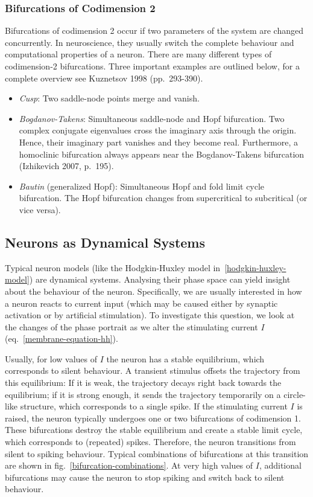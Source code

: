 \documentclass[12pt,a4paper,]{report}
\begin{document}
\subsubsection{Bifurcations of Codimension
2}\label{bifurcations-of-codimension-2}

Bifurcations of codimension 2 occur if two parameters of the system are
changed concurrently. In neuroscience, they usually switch the complete
behaviour and computational properties of a neuron. There are many
different types of codimension-2 bifurcations. Three important examples
are outlined below, for a complete overview see Kuznetsov 1998
(pp.~293-390).

\begin{itemize}
\item
  \emph{Cusp}: Two saddle-node points merge and vanish.
\item
  \emph{Bogdanov-Takens}: Simultaneous saddle-node and Hopf bifurcation.
  Two complex conjugate eigenvalues cross the imaginary axis through the
  origin. Hence, their imaginary part vanishes and they become real.
  Furthermore, a homoclinic bifurcation always appears near the
  Bogdanov-Takens bifurcation (Izhikevich 2007, p.~195).
\item
  \emph{Bautin} (generalized Hopf): Simultaneous Hopf and fold limit
  cycle bifurcation. The Hopf bifurcation changes from supercritical to
  subcritical (or vice versa).
\end{itemize}

\subsection{Neurons as Dynamical
Systems}\label{neurons-as-dynamical-systems}

Typical neuron models (like the Hodgkin-Huxley model
in~\ref{hodgkin-huxley-model}) are dynamical systems. Analysing their
phase space can yield insight about the behaviour of the neuron.
Specifically, we are usually interested in how a neuron reacts to
current input (which may be caused either by synaptic activation or by
artificial stimulation). To investigate this question, we look at the
changes of the phase portrait as we alter the stimulating current $I$
(eq.~\ref{membrane-equation-hh}).

Usually, for low values of $I$ the neuron has a stable equilibrium,
which corresponds to silent behaviour. A transient stimulus offsets the
trajectory from this equilibrium: If it is weak, the trajectory decays
right back towards the equilibrium; if it is strong enough, it sends the
trajectory temporarily on a circle-like structure, which corresponds to
a single spike. If the stimulating current $I$ is raised, the neuron
typically undergoes one or two bifurcations of codimension 1. These
bifurcations destroy the stable equilibrium and create a stable limit
cycle, which corresponds to (repeated) spikes. Therefore, the neuron
transitions from silent to spiking behaviour. Typical combinations of
bifurcations at this transition are shown in
fig.~\ref{bifurcation-combinations}. At very high values of $I$,
additional bifurcations may cause the neuron to stop spiking and switch
back to silent behaviour.
\end{document}
